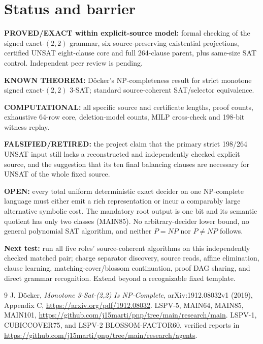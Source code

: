 \documentclass[11pt]{article}
\begin{document}
\section{Status and barrier}
\noindent\textbf{PROVED/EXACT within explicit-source model:} formal checking of the signed exact-$(2,2)$ grammar, six source-preserving existential projections, certified UNSAT eight-clause core and full 264-clause parent, plus same-size SAT control. Independent peer review is pending.
\par\noindent\textbf{KNOWN THEOREM:} D\"ocker's NP-completeness result for strict monotone signed exact-$(2,2)$ 3-SAT; standard source-coherent SAT/selector equivalence.
\par\noindent\textbf{COMPUTATIONAL:} all specific source and certificate lengths, proof counts, exhaustive 64-row core, deletion-model counts, MILP cross-check and 198-bit witness replay.
\par\noindent\textbf{FALSIFIED/RETIRED:} the project claim that the primary strict 198/264 UNSAT input still lacks a reconstructed and independently checked explicit source, and the suggestion that its ten final balancing clauses are necessary for UNSAT of the whole fixed source.
\par\noindent\textbf{OPEN:} every total uniform deterministic exact decider on one NP-complete language must either emit a rich representation or incur a comparably large alternative symbolic cost. The mandatory root output is one bit and its semantic quotient has only two classes (MAIN85). No arbitrary-decider lower bound, no general polynomial SAT algorithm, and neither $P=NP$ nor $P\ne NP$ follows.
\par\noindent\textbf{Next test:} run all five roles' source-coherent algorithms on this independently checked matched pair; charge separator discovery, source reads, affine elimination, clause learning, matching-cover/blossom continuation, proof DAG sharing, and direct grammar recognition. Extend beyond a recognizable fixed template.

\begin{thebibliography}{9}
 J. D\"ocker, \emph{Monotone 3-Sat-(2,2) Is NP-Complete}, arXiv:1912.08032v1 (2019), Appendix C, \url{https://arxiv.org/pdf/1912.08032}.
 LSPV-5, MAIN64, MAIN85, MAIN101, \url{https://github.com/j15marti/pnp/tree/main/research/main}.
 LSPV-1, CUBICCOVER75, and LSPV-2 BLOSSOM-FACTOR60, verified reports in \url{https://github.com/j15marti/pnp/tree/main/research/agents}.
\end{thebibliography}
\end{document}
